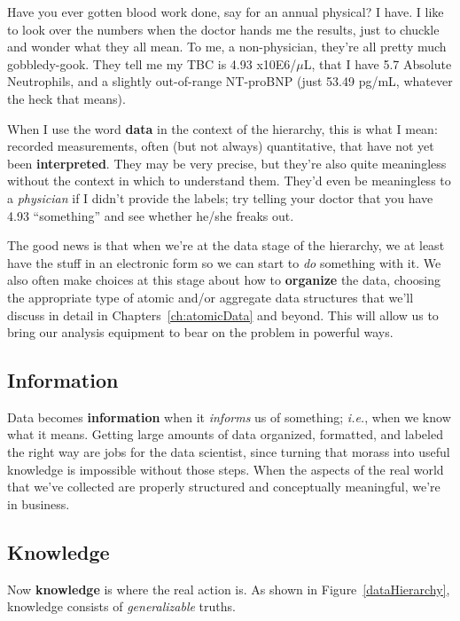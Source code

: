 Have you ever gotten blood work done, say for an annual physical? I have. I
like to look over the numbers when the doctor hands me the results, just to
chuckle and wonder what they all mean. To me, a non-physician, they're all
pretty much gobbledy-gook. They tell me my TBC is 4.93 x10E6/$\mu$L, that
I have 5.7 Absolute Neutrophils, and a slightly out-of-range NT-proBNP (just
53.49 pg/mL, whatever the heck that means).

When I use the word \textbf{data} in the context of the hierarchy, this is what
I mean: recorded measurements, often (but not always) quantitative, that have
not yet been \textbf{interpreted}. They may be very precise, but they're also
quite meaningless without the context in which to understand them. They'd even
be meaningless to a \textit{physician} if I didn't provide the labels; try
telling your doctor that you have 4.93 ``something'' and see whether he/she
freaks out.

The good news is that when we're at the data stage of the hierarchy, we at
least have the stuff in an electronic form so we can start to \textit{do}
something with it. We also often make choices at this stage about how to
\textbf{organize} the data, choosing the appropriate type of atomic and/or
aggregate data structures that we'll discuss in detail in
Chapters~\ref{ch:atomicData} and beyond. This will allow us to bring our
analysis equipment to bear on the problem in powerful ways.

\subsection{Information}

Data becomes \textbf{information} when it \textit{informs} us of something;
\textit{i.e.}, when we know what it means. Getting large amounts of data
organized, formatted, and labeled the right way are jobs for the data
scientist, since turning that morass into useful knowledge is impossible
without those steps. When the aspects of the real world that we've collected
are properly structured and conceptually meaningful, we're in business.


\subsection{Knowledge}

Now \textbf{knowledge} is where the real action is. As shown in
Figure~\ref{dataHierarchy}, knowledge consists of \textit{generalizable}
truths.

